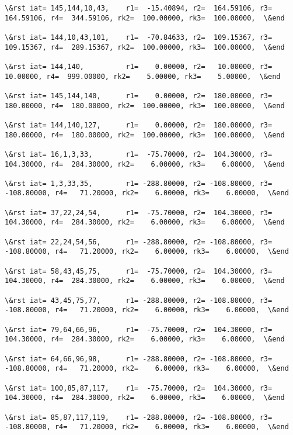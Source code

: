 \documentclass[11pt]{article}
\begin{document}
\begin{Verbatim}[commandchars=\\\{\}]
\&rst iat= 145,144,10,43,    r1=  -15.40894, r2=  164.59106, r3=  164.59106, r4=  344.59106, rk2=  100.00000, rk3=  100.00000,  \&end

\&rst iat= 144,10,43,101,    r1=  -70.84633, r2=  109.15367, r3=  109.15367, r4=  289.15367, rk2=  100.00000, rk3=  100.00000,  \&end

\&rst iat= 144,140,          r1=    0.00000, r2=   10.00000, r3=   10.00000, r4=  999.00000, rk2=    5.00000, rk3=    5.00000,  \&end

\&rst iat= 145,144,140,      r1=    0.00000, r2=  180.00000, r3=  180.00000, r4=  180.00000, rk2=  100.00000, rk3=  100.00000,  \&end

\&rst iat= 144,140,127,      r1=    0.00000, r2=  180.00000, r3=  180.00000, r4=  180.00000, rk2=  100.00000, rk3=  100.00000,  \&end

\&rst iat= 16,1,3,33,        r1=  -75.70000, r2=  104.30000, r3=  104.30000, r4=  284.30000, rk2=    6.00000, rk3=    6.00000,  \&end

\&rst iat= 1,3,33,35,        r1= -288.80000, r2= -108.80000, r3= -108.80000, r4=   71.20000, rk2=    6.00000, rk3=    6.00000,  \&end

\&rst iat= 37,22,24,54,      r1=  -75.70000, r2=  104.30000, r3=  104.30000, r4=  284.30000, rk2=    6.00000, rk3=    6.00000,  \&end

\&rst iat= 22,24,54,56,      r1= -288.80000, r2= -108.80000, r3= -108.80000, r4=   71.20000, rk2=    6.00000, rk3=    6.00000,  \&end

\&rst iat= 58,43,45,75,      r1=  -75.70000, r2=  104.30000, r3=  104.30000, r4=  284.30000, rk2=    6.00000, rk3=    6.00000,  \&end

\&rst iat= 43,45,75,77,      r1= -288.80000, r2= -108.80000, r3= -108.80000, r4=   71.20000, rk2=    6.00000, rk3=    6.00000,  \&end

\&rst iat= 79,64,66,96,      r1=  -75.70000, r2=  104.30000, r3=  104.30000, r4=  284.30000, rk2=    6.00000, rk3=    6.00000,  \&end

\&rst iat= 64,66,96,98,      r1= -288.80000, r2= -108.80000, r3= -108.80000, r4=   71.20000, rk2=    6.00000, rk3=    6.00000,  \&end

\&rst iat= 100,85,87,117,    r1=  -75.70000, r2=  104.30000, r3=  104.30000, r4=  284.30000, rk2=    6.00000, rk3=    6.00000,  \&end

\&rst iat= 85,87,117,119,    r1= -288.80000, r2= -108.80000, r3= -108.80000, r4=   71.20000, rk2=    6.00000, rk3=    6.00000,  \&end


\end{Verbatim}
\end{document}
